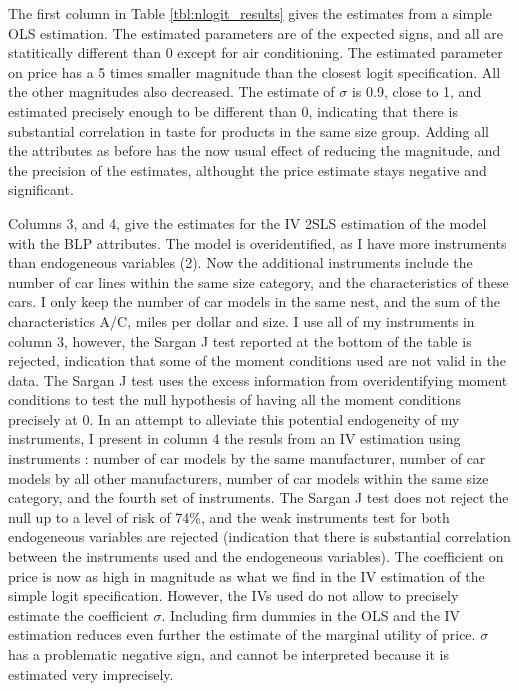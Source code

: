 \documentclass{article}\usepackage[]{graphicx}\usepackage[]{color}
\begin{document}
%

The first column in Table \ref{tbl:nlogit_results} gives the estimates from a simple OLS estimation. The estimated parameters are of the expected signs, and all are statitically different than 0 except for air conditioning. The estimated parameter on price has a  5 times smaller magnitude than the closest logit specification. All the other magnitudes also decreased. The estimate of $\sigma$ is 0.9, close to 1, and estimated precisely enough to be different than 0, indicating that there is substantial correlation in taste for products in the same size group. Adding all the attributes as before has the now usual effect of reducing the magnitude, and the precision of the estimates, althought the price estimate stays negative and significant.

Columns 3, and 4, give the estimates for the IV 2SLS estimation of the model with the BLP attributes. The model is overidentified, as I have more instruments than endogeneous variables (2). Now the additional instruments include the number of car lines within the same size category, and the characteristics of these cars. I only keep the number of car models in the same nest, and the sum of the characteristics A/C, miles per dollar and size. I use all of my instruments in column 3, however, the Sargan J test reported at the bottom of the table is rejected, indication that some of the moment conditions used are not valid in the data. The Sargan J test uses the excess information from overidentifying moment conditions to test the null hypothesis of having all the moment conditions precisely at 0. In an attempt to alleviate this potential endogeneity of my instruments, I present in column 4 the resuls from an IV estimation using instruments : number of car models by the same manufacturer, number of car models by all other manufacturers, number of car models within the same size category, and the fourth set of instruments. The Sargan J test does not reject the null up to a level of risk of 74\%, and the weak instruments test for both endogeneous variables are rejected (indication that there is substantial correlation between the instruments used and the endogeneous variables). The coefficient on price is now as high in magnitude as what we find in the IV estimation of the simple logit specification. However, the IVs used do not allow to precisely estimate the coefficient $\sigma$. Including firm dummies in the OLS and the IV estimation reduces even further the estimate of the marginal utility of price. $\sigma$ has a problematic negative sign, and cannot be interpreted because it is estimated very imprecisely. 
%
\end{document}
